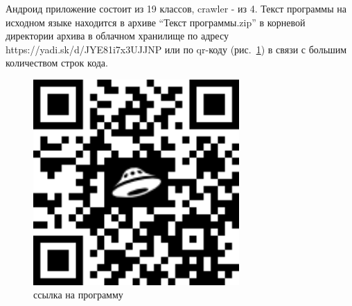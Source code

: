 Андроид приложение состоит из 19 классов, crawler - из 4.
Текст программы на исходном языке находится в архиве “Текст
программы.zip” в корневой директории архива в облачном хранилище по
адресу https://yadi.sk/d/JYE81i7x3UJJNP или по qr-коду (рис.~\ref{qr}) в связи с большим количеством строк
кода.

\begin{figure}[h!]
    \centering
    \includegraphics[width=0.7\textwidth]{./qr.png}
    \caption{ссылка на программу}
    \label{qr}
\end{figure}

